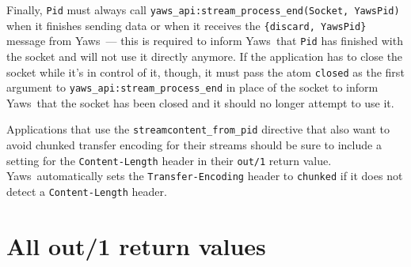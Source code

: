 \documentclass[11pt,oneside,english]{book}
\newcommand{\Yaws}            %
        {{\sc Yaws}}
\begin{document}
Finally, \verb+Pid+ must always call
\verb+yaws_api:stream_process_end(Socket, YawsPid)+ when it finishes
sending data or when it receives the \verb+{discard, YawsPid}+ message
from \Yaws\ --- this is required to inform \Yaws\ that \verb+Pid+ has
finished with the socket and will not use it directly anymore. If the
application has to close the socket while it's in control of it,
though, it must pass the atom \verb+closed+ as the first argument to
\verb+yaws_api:stream_process_end+ in place of the socket to inform
\Yaws\ that the socket has been closed and it should no longer attempt
to use it.

App\-li\-ca\-tions that use the \verb+streamcontent_from_pid+
directive that also want to a\-void chunked transfer encoding for
their streams should be sure to include a set\-ting for the
\verb+Content-Length+ header in their \verb+out/1+ return
value. \Yaws\ au\-to\-mat\-i\-cal\-ly sets the
\verb+Transfer-Encoding+ head\-er to \verb+chunked+ if it does not
detect a \verb+Content-Length+ header.

\section{All out/1 return values}
\end{document}
